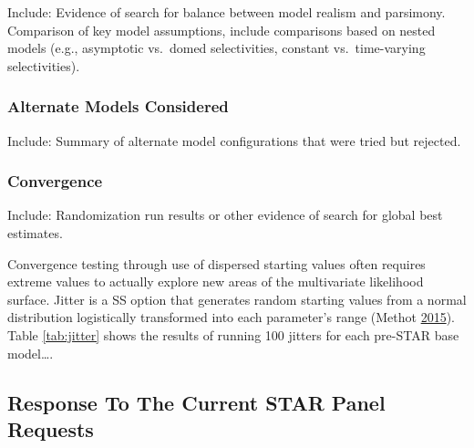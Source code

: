 \documentclass[12pt,]{article}
\begin{document}
Include: Evidence of search for balance between model realism and
parsimony.\\
Comparison of key model assumptions, include comparisons based on nested
models (e.g., asymptotic vs.~domed selectivities, constant
vs.~time-varying selectivities).

\subsubsection{Alternate Models
Considered}\label{alternate-models-considered}

Include: Summary of alternate model configurations that were tried but
rejected.

\subsubsection{Convergence}\label{convergence}

Include: Randomization run results or other evidence of search for
global best estimates.

Convergence testing through use of dispersed starting values often
requires extreme values to actually explore new areas of the
multivariate likelihood surface. Jitter is a SS option that generates
random starting values from a normal distribution logistically
transformed into each parameter's range (Methot
\protect\hyperlink{ref-Methot2015}{2015}). Table \ref{tab:jitter} shows
the results of running 100 jitters for each pre-STAR base model\ldots{}.

\subsection{Response To The Current STAR Panel
Requests}\label{response-to-the-current-star-panel-requests}
\end{document}
